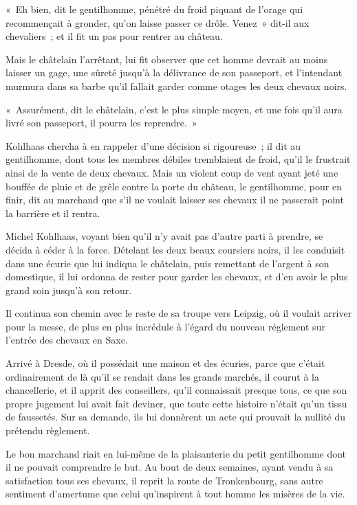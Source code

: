 \documentclass[french,twoside]{book} %
\begin{document}
« Eh bien, dit le gentilhomme, pénétré du froid piquant de l’orage qui recommençait à gronder, qu’on laisse passer ce drôle. Venez » dit-il aux chevaliers ; et il fit un pas pour rentrer au château.\par
Mais le châtelain l’arrêtant, lui fit observer que cet homme devrait au moins laisser un gage, une sûreté jusqu’à la délivrance de son passeport, et l’intendant murmura dans sa barbe qu’il fallait garder comme otages les deux chevaux noirs.\par
« Assurément, dit le châtelain, c’est le plus simple moyen, et une fois qu’il aura livré son passeport, il pourra les reprendre. »\par
Kohlhaas chercha à en rappeler d’une décision si rigoureuse ; il dit au gentilhomme, dont tous les membres débiles tremblaient de froid, qu’il le frustrait ainsi de la vente de deux chevaux. Mais un violent coup de vent ayant jeté une bouffée de pluie et de grêle contre la porte du château, le gentilhomme, pour en finir, dit au marchand que s’il ne voulait laisser ses chevaux il ne passerait point la barrière et il rentra.\par
Michel Kohlhaas, voyant bien qu’il n’y avait pas d’autre parti à prendre, se décida à céder à la force. Dételant les deux beaux coursiers noirs, il les conduisit dans une écurie que lui indiqua le châtelain, puis remettant de l’argent à son domestique, il lui ordonna de rester pour garder les chevaux, et d’en avoir le plus grand soin jusqu’à son retour.\par
Il continua son chemin avec le reste de sa troupe vers Leipzig, où il voulait arriver pour la messe, de plus en plus incrédule à l’égard du nouveau réglement sur l’entrée des chevaux en Saxe.\par
Arrivé à Dresde, où il possédait une maison et des écuries, parce que c’était ordinairement de là qu’il se rendait dans les grands marchés, il courut à la chancellerie, et il apprit des conseillers, qu’il connaissait presque tous, ce que son propre jugement lui avait fait deviner, que toute cette histoire n’était qu’un tissu de faussetés. Sur sa demande, ils lui donnèrent un acte qui prouvait la nullité du prétendu règlement.\par
Le bon marchand riait en lui-même de la plaisanterie du petit gentilhomme dont il ne pouvait comprendre le but. Au bout de deux semaines, ayant vendu à sa satisfaction tous ses chevaux, il reprit la route de Tronkenbourg, sans autre sentiment d’amertume que celui qu’inspirent à tout homme les misères de la vie.\par
\end{document}
